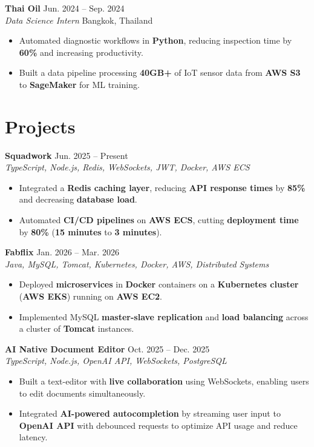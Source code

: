 \documentclass[letterpaper,11pt]{article}
\begin{document}
\textbf{Thai Oil} \hfill Jun. 2024 -- Sep. 2024 \\
\textit{Data Science Intern} \hfill Bangkok, Thailand
\begin{itemize}
  \item Automated diagnostic workflows in \textbf{Python}, reducing inspection time by \textbf{60\%} and increasing productivity.
  \item Built a data pipeline processing \textbf{40GB+} of IoT sensor data from \textbf{AWS S3} to \textbf{SageMaker} for ML training.
\end{itemize}
\section*{Projects}
\textbf{Squadwork} \hfill Jun. 2025 -- Present \\
\textit{TypeScript, Node.js, Redis, WebSockets, JWT, Docker, AWS ECS} \hfill 
\begin{itemize}
  \item Integrated a \textbf{Redis caching layer}, reducing \textbf{API response times} by \textbf{85\%} and decreasing \textbf{database load}.
  \item Automated \textbf{CI/CD pipelines} on \textbf{AWS ECS}, cutting \textbf{deployment time} by \textbf{80\%} (\textbf{15 minutes} to \textbf{3 minutes}).
\end{itemize}

\textbf{Fabflix} \hfill Jan. 2026 -- Mar. 2026 \\
\textit{Java, MySQL, Tomcat, Kubernetes, Docker, AWS, Distributed Systems} \hfill 
\begin{itemize}
  \item Deployed \textbf{microservices} in \textbf{Docker} containers on a \textbf{Kubernetes cluster} (\textbf{AWS EKS}) running on \textbf{AWS EC2}.
  \item Implemented MySQL \textbf{master-slave replication} and \textbf{load balancing} across a cluster of \textbf{Tomcat} instances.
\end{itemize}

\textbf{AI Native Document Editor} \hfill Oct. 2025 -- Dec. 2025 \\
\textit{TypeScript, Node.js, OpenAI API, WebSockets, PostgreSQL} \hfill 
\begin{itemize}
  \item Built a text-editor with \textbf{live collaboration} using WebSockets, enabling users to edit documents simultaneously.
  \item Integrated \textbf{AI-powered autocompletion} by streaming user input to \textbf{OpenAI API} with debounced requests to optimize API usage and reduce latency.
\end{itemize}
\end{document}
